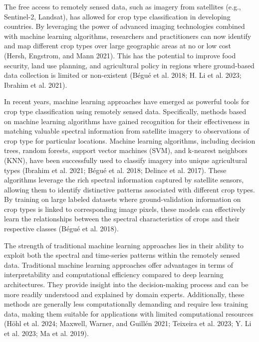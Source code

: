 \documentclass[
  journal,
  twocolumn]{IEEEtran}
\begin{document}
The free access to remotely sensed data, such as imagery from satellites
(e.g., Sentinel-2, Landsat), has allowed for crop type classification in
developing countries. By leveraging the power of advanced imaging
technologies combined with machine learning algorithms, researchers and
practitioners can now identify and map different crop types over large
geographic areas at no or low cost (Hersh, Engstrom, and Mann 2021).
This has the potential to improve food security, land use planning, and
agricultural policy in regions where ground-based data collection is
limited or non-existent (Bégué et al. 2018; H. Li et al. 2023; Ibrahim
et al. 2021).

In recent years, machine learning approaches have emerged as powerful
tools for crop type classification using remotely sensed data.
Specifically, methods based on machine learning algorithms have gained
recognition for their effectiveness in matching valuable spectral
information from satellite imagery to observations of crop type for
particular locations. Machine learning algorithms, including decision
trees, random forests, support vector machines (SVM), and k-nearest
neighbors (KNN), have been successfully used to classify imagery into
unique agricultural types (Ibrahim et al. 2021; Bégué et al. 2018;
Delince et al. 2017). These algorithms leverage the rich spectral
information captured by satellite sensors, allowing them to identify
distinctive patterns associated with different crop types. By training
on large labeled datasets where ground-validation information on crop
types is linked to corresponding image pixels, these models can
effectively learn the relationships between the spectral characteristics
of crops and their respective classes (Bégué et al. 2018).

The strength of traditional machine learning approaches lies in their
ability to exploit both the spectral and time-series patterns within the
remotely sensed data. Traditional machine learning approaches offer
advantages in terms of interpretability and computational efficiency
compared to deep learning architectures. They provide insight into the
decision-making process and can be more readily understood and explained
by domain experts. Additionally, these methods are generally less
computationally demanding and require less training data, making them
suitable for applications with limited computational resources (Höhl et
al. 2024; Maxwell, Warner, and Guillén 2021; Teixeira et al. 2023; Y. Li
et al. 2023; Ma et al. 2019).
\end{document}
